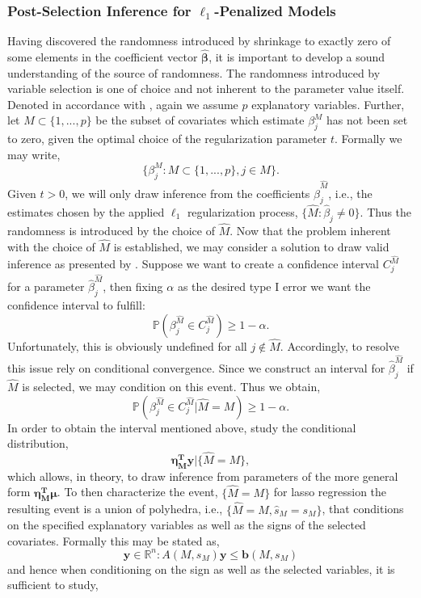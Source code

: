 \documentclass[a4paper,12pt, headsepline]{scrartcl}
\numberwithin{equation}{section}
\begin{document}
\subsubsection{Post-Selection Inference for $\ell_1$-Penalized Models}\label{subsubsec:psi}
Having discovered the randomness introduced by shrinkage to exactly zero of some elements in the coefficient vector $\bm{\hat{\beta}}$, it is important to develop a sound understanding of the source of randomness. The randomness introduced by variable selection is one of choice and not inherent to the parameter value itself. Denoted in accordance with \citet{Lee2016}, again we assume $p$ explanatory variables. Further, let $M\subset\{1, ..., p\}$ be the subset of covariates which estimate $\beta_j^M$ has not been set to zero, given the optimal choice of the regularization parameter $t$. Formally we may write,
\[
\{\beta_j^M: M\subset\{1, ..., p\}, j \in M\}.
\]
Given $t > 0$, we will only draw inference from the coefficients $\hat\beta_j^{\hat M}$, i.e., the estimates chosen by the applied $\ell_1$ regularization process, $\{\hat M: \hat\beta_j \neq 0\}$. Thus the randomness is introduced by the choice of $\hat M$. Now that the problem inherent with the choice of $\hat M$ is established, we may consider a solution to draw valid inference as presented by \citet{Lee2016}. Suppose we want to create a confidence interval $C_j^{\hat M}$ for a parameter $\hat\beta_j^{\hat M}$, then fixing $\alpha$ as the desired type I error we want the confidence interval to fulfill:
\[
\mathbb{P}(\beta_j^{\hat M} \in C_j^{\hat M}) \geq 1 - \alpha.
\]
Unfortunately, this is obviously undefined for all $j \notin \hat M$. Accordingly, to resolve this issue \citet{Lee2016} rely on conditional convergence. Since we construct an interval for $\hat\beta_j^{\hat M}$ if $\hat M$ is selected, we may condition on this event. Thus we obtain,
\[
\mathbb{P}(\beta_j^{\hat M} \in C_j^{\hat M}| \hat M = M) \geq 1 - \alpha.
\]
In order to obtain the interval mentioned above, \citet{Lee2016} study the conditional distribution,
\[
\bm{\eta_M^Ty}|\{\hat M = M\},
\]
which allows, in theory, to draw inference from parameters of the more general form $\bm{\eta_M^T\mu}$. To then characterize the event, $\{\hat M = M\}$ for lasso regression the resulting event is a union of polyhedra, i.e., $\{\hat M = M, \hat s_M = s_M\}$, that conditions on the specified explanatory variables as well as the signs of the selected covariates. Formally this may be stated as,
\[
\bm{y} \in \mathbb{R}^n: A(M, s_M)\bm{y} \leq \bm{b}(M, s_M)
\]
and hence when conditioning on the sign as well as the selected variables, it is sufficient to study,
\end{document}
